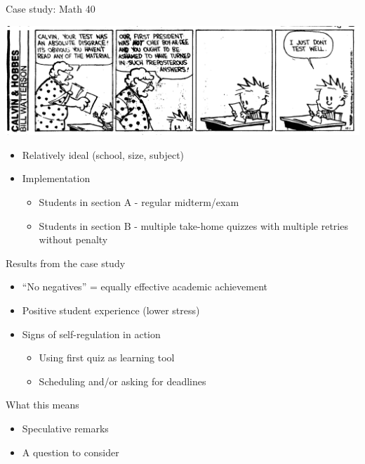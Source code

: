 \documentclass{beamer}
\begin{document}
\begin{frame}{Case study: Math 40}

  \includegraphics[width=\textwidth]{ch.jpg}

  \begin{itemize}
    \item Relatively ideal (school, size, subject)
    \item Implementation
    \begin{itemize}
      \item Students in section A - regular midterm/exam
      \item Students in section B - multiple take-home quizzes with multiple retries without penalty
    \end{itemize}
  \end{itemize}
\end{frame}
\begin{frame}{Results from the case study}
  \begin{itemize}
    \item ``No negatives'' = equally effective academic achievement
    \item Positive student experience (lower stress)
    \item Signs of self-regulation in action
    \begin{itemize}
      \item Using first quiz as learning tool
      \item Scheduling and/or asking for deadlines
    \end{itemize}
  \end{itemize}
\end{frame}
\begin{frame}{What this means}
  \begin{itemize}
    \item Speculative remarks
    \item A question to consider
  \end{itemize}
\end{frame}
\end{document}
